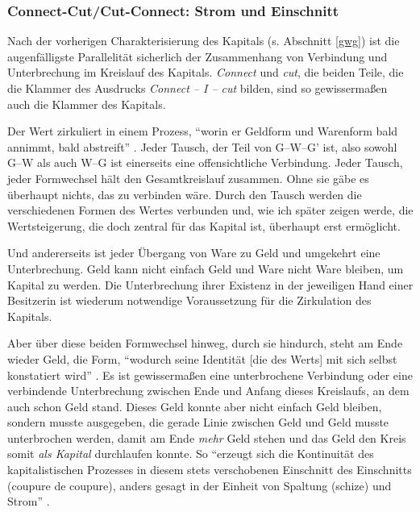 \documentclass[12pt,
               DIV13,
               paper=a4,
               twoside=false,
               onehalfspacing,
               bibliography=totoc,
               toc=graduated,
               draft,
               ]{scrartcl}
\newcommand{\pc}[2]{\parencite[#1]{#2}}
\newcommand{\worries}[1]{\ifdraft{\textcolor{blue}{\texttt{(#1)}}}{}}
\newcommand{\gwg}{G--W--G'\xspace}
\newcommand{\cic}{Connect -- I -- cut\xspace}
\begin{document}


\subsubsection{Connect-Cut/Cut-Connect: Strom und Einschnitt}


Nach der vorherigen Charakterisierung des Kapitals (s. Abschnitt \ref{gwg}) ist
die augenfälligste Parallelität sicherlich der Zusammenhang von
Verbindung und Unterbrechung im Kreislauf des Kapitals. \emph{Connect}
und \emph{cut}, die beiden Teile, die die Klammer des Ausdrucks \emph{\cic}
bilden, sind so gewissermaßen auch die Klammer des Kapitals.


Der Wert zirkuliert in einem Prozess, "`worin er Geldform und
Warenform bald annimmt, bald abstreift"' \pc{169}{kap}. Jeder Tausch,
der Teil von \gwg ist, also sowohl G--W als auch W--G ist einerseits
eine offensichtliche Verbindung. Jeder Tausch, jeder Formwechsel hält
den Gesamtkreislauf zusammen. Ohne sie gäbe es überhaupt nichts, das
zu verbinden wäre. Durch den Tausch werden die verschiedenen Formen
des Wertes verbunden und, wie ich später zeigen werde, die
Wertsteigerung, die doch zentral für das Kapital ist, überhaupt erst
ermöglicht.


Und andererseits ist jeder Übergang von Ware zu Geld und umgekehrt
eine Unterbrechung. Geld kann nicht einfach Geld und Ware nicht Ware
bleiben, um Kapital zu werden. Die Unterbrechung ihrer Existenz in der
jeweiligen Hand einer Besitzerin ist wiederum notwendige
Voraussetzung für die Zirkulation des Kapitals.


Aber über diese beiden Formwechsel hinweg, durch sie hindurch, steht
am Ende wieder Geld, die Form, "`wodurch seine Identität [die des
Werts] mit sich selbst konstatiert wird"' \pc{169}{kap}. Es ist
gewissermaßen eine unterbrochene Verbindung oder eine verbindende
Unterbrechung zwischen Ende und Anfang dieses Kreislaufs, an dem auch
schon Geld stand. Dieses Geld konnte aber nicht einfach Geld bleiben,
sondern musste ausgegeben, die gerade Linie zwischen Geld und Geld
musste unterbrochen werden, damit am Ende \emph{mehr} Geld stehen und
das Geld den Kreis somit \emph{als Kapital} durchlaufen konnte. So
"`erzeugt sich die Kontinuität des kapitalistischen Prozesses in
diesem stets verschobenen Einschnitt des Einschnitts (coupure de
coupure), anders gesagt in der Einheit von Spaltung (schize) und
Strom"' \pc{296}{ao}.
\end{document}
